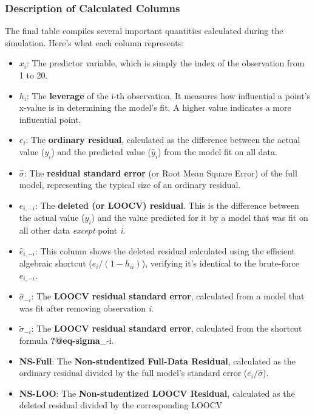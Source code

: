 \documentclass[
  letterpaper,
  DIV=11,
  numbers=noendperiod]{scrreprt}
\providecommand{\tightlist}{%
  \setlength{\itemsep}{0pt}\setlength{\parskip}{0pt}}\usepackage{longtable,booktabs,array}
\begin{document}
\subsubsection{Description of Calculated
Columns}\label{description-of-calculated-columns}

The final table compiles several important quantities calculated during
the simulation. Here's what each column represents:

\begin{itemize}
\tightlist
\item
  \(x_i\): The predictor variable, which is simply the index of the
  observation from 1 to 20.
\item
  \(h_i\): The \textbf{leverage} of the i-th observation. It measures
  how influential a point's x-value is in determining the model's fit. A
  higher value indicates a more influential point.
\item
  \(e_i\): The \textbf{ordinary residual}, calculated as the difference
  between the actual value (\(y_i\)) and the predicted value
  (\(\hat{y}_i\)) from the model fit on all data.
\item
  \(\hat{\sigma}\): The \textbf{residual standard error} (or Root Mean
  Square Error) of the full model, representing the typical size of an
  ordinary residual.
\item
  \(e_{i,-i}\): The \textbf{deleted (or LOOCV) residual}. This is the
  difference between the actual value (\(y_i\)) and the value predicted
  for it by a model that was fit on all other data \emph{except} point
  \emph{i}.
\item
  \(\hat{e}_{i,-i}\): This column shows the deleted residual calculated
  using the efficient algebraic shortcut (\(e_i / (1-h_{ii})\)),
  verifying it's identical to the brute-force \(e_{i,-i}\).
\item
  \(\hat{\sigma}_{-i}\): The \textbf{LOOCV residual standard error},
  calculated from a model that was fit after removing observation
  \emph{i}.
\item
  \(\tilde{\sigma}_{-i}\): The \textbf{LOOCV residual standard error},
  calculated from the shortcut formula \textbf{?@eq-sigma}\_-i.
\item
  \textbf{NS-Full}: The \textbf{Non-studentized Full-Data Residual},
  calculated as the ordinary residual divided by the full model's
  standard error (\(e_i / \hat{\sigma}\)).
\item
  \textbf{NS-LOO}: The \textbf{Non-studentized LOOCV Residual},
  calculated as the deleted residual divided by the corresponding LOOCV

\end{itemize}
\end{document}
